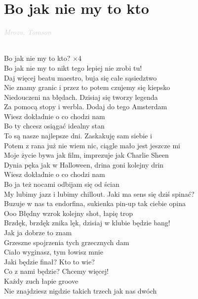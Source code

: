 \documentclass[a5paper, 10pt]{book}
\begin{document}
\section{Bo jak nie my to kto}\textcolor{lightgray}{\textit{Mrozu, Tomson}}\\~\\
\begin{minipage}[t]{0.8\textwidth}
\hspace*{5mm}Bo jak nie my to kto? $\times 4$\\
\hspace*{5mm}Bo jak nie my to nikt tego lepiej nie zrobi tu!\\

Daj więcej beatu maestro, buja się całe sąsiedztwo\\
Nie znamy granic i przez to potem czujemy się kiepsko\\
Niedouczeni na błędach. Dzisiaj się tworzy legenda\\
Za pomocą stopy i werbla. Dodaj do tego Amsterdam\\
Wiesz dokładnie o co chodzi nam\\
Bo ty chcesz osiągać idealny stan\\

To są nasze najlepsze dni. Zaskakuję sam siebie i\\
Potem z rana już nie wiem nic, ciągle mało jest jeszcze mi\\
Moje życie bywa jak film, imprezuje jak Charlie Sheen\\
Dynia pęka jak w Halloween, drina goni kolejny drin\\
Wiesz dokładnie o co chodzi nam\\
Bo ja też nocami odbijam się od ścian\\

My lubimy jazz i lubimy chillout. Jaki ma sens się dziś spinać?\\
Buzuje w nas ta endorfina, sukienka pin-up tak ciebie opina\\
Ooo Błędny wzrok kolejny shot, łapię trop\\
Brzdęk, brzdęk znika lęk, dzisiaj w klubie będzie bang!\\
Jak ja dobrze to znam\\
Grzeszne spojrzenia tych grzecznych dam\\

Ciało wyginasz, tym łowisz mnie\\
Jaki będzie finał? Kto to wie?\\
Co z nami będzie? Chcemy więcej!\\
Każdy zuch łapie groove\\
Nie znajdziesz nigdzie takich trzech jak nas dwóch\\
\end{minipage}
\end{document}
